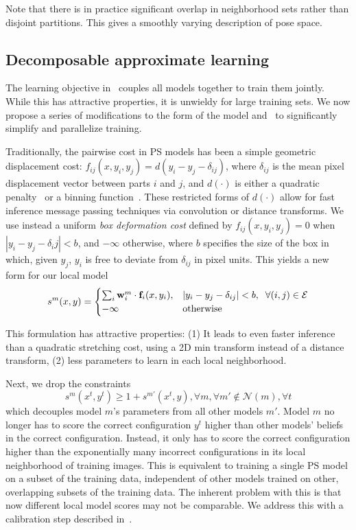 Note that there is in practice significant overlap in neighborhood sets rather than disjoint partitions.  This gives a smoothly varying description of pose space.

\subsection{Decomposable approximate learning}
The learning objective in~ couples all models together to 
train them jointly.  While this has attractive properties, it is unwieldy for 
large training sets.  We now propose a series of modifications to the form of 
the model and~ to significantly simplify and parallelize 
training.

\label{sec:boxdist}
Traditionally, the pairwise cost in PS models has been a simple geometric 
displacement cost: $f_{ij}(x,y_i,y_j) = d(y_i - y_j - \delta_{ij})$, where 
$\delta_{ij}$ is the mean pixel displacement vector between parts $i$ and $j$, 
and $d(\cdot)$ is either a quadratic penalty~\citep{felz05} or a binning 
function~\citep{devacrf}.  These restricted forms of $d(\cdot)$ allow for fast 
inference message passing techniques via convolution or distance transforms.  
We use instead a uniform {\em box deformation cost} defined by 
$f_{ij}(x,y_i,y_j) = 0$ when $|y_i - y_j - \delta_ij| < b$, and $-\infty$ 
otherwise, where $b$ specifies the size of the box in which, given $y_j$, $y_i$ 
is free to deviate from $\delta_{ij}$ in pixel units.  This yields a new form 
for our local model \begin{align}\label{eq:boxdist}
s^m(x,y) = 
\begin{cases}
 \sum_i \mathbf{w}^m_i \cdot \mathbf{f}_i(x,y_i), & |y_i - y_j - \delta_{ij}| < b,\;\; \forall 
(i,j) \in \mathcal{E} \\
 -\infty & \text{otherwise}
 \end{cases}
\end{align}

This formulation has attractive properties: (1) It leads to even faster inference than a quadratic stretching cost, using a 2D min transform instead of a distance transform, (2) less parameters to learn in each local neighborhood.

 Next, we drop the constraints
$$s^m(x^t,y^t) \geq 1 + s^{m'}(x^t,y), \forall m, \forall m'\notin 
\mathcal{N}(m),\forall t$$ which decouples model $m$'s parameters from all 
other models $m'$.  Model $m$ no longer has to score the correct configuration 
$y^t$ higher than other models' beliefs in the correct configuration.  Instead, 
it only has to score the correct configuration higher than the exponentially 
many incorrect configurations in its local neighborhood of training images.  
This is equivalent to training a single PS model on a subset of the training 
data, independent of other models trained on other, overlapping subsets of the 
training data.  The inherent problem with this is that now different local 
model scores may not be comparable.  We address this with a calibration step 
described in~.

